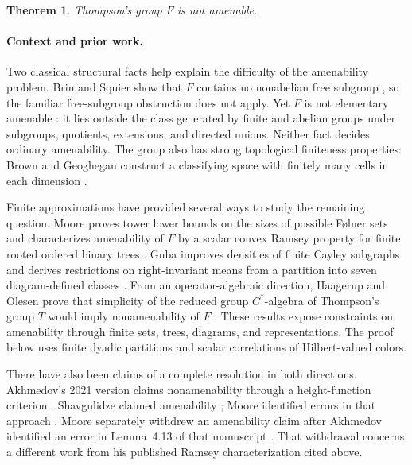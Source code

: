 \documentclass[11pt]{article}
\newtheorem{theorem}{Theorem}[section]
\theoremstyle{definition}
\numberwithin{equation}{section}
\begin{document}
\begin{theorem}\label{thm:main}
Thompson's group \(F\) is not amenable.
\end{theorem}

\paragraph{Context and prior work.}
Two classical structural facts help explain the difficulty of the
amenability problem. Brin and Squier show that \(F\) contains no
nonabelian free subgroup \cite[Theorem~3.1]{BrinSquier1985}, so the familiar
free-subgroup obstruction does not apply. Yet \(F\) is not elementary
amenable \cite[Theorem~4.10]{CannonFloydParry1996}: it lies outside the class
generated by finite and abelian groups under subgroups, quotients,
extensions, and directed unions. Neither fact decides ordinary
amenability. The group also has strong topological finiteness properties:
Brown and Geoghegan construct a classifying space with finitely many
cells in each dimension \cite{BrownGeoghegan1984}.

Finite approximations have provided several ways to study the remaining
question. Moore proves tower lower bounds on the sizes of possible
F\o lner sets \cite[Theorem~1.1]{MooreFolner2013} and characterizes
amenability of \(F\) by a scalar convex Ramsey property for finite rooted
ordered binary trees \cite[Theorem~3.1]{Moore2013}. Guba improves densities
of finite Cayley subgraphs \cite{Guba2025Density} and derives restrictions
on right-invariant means from a partition into seven diagram-defined
classes \cite{Guba2026}. From an operator-algebraic
direction, Haagerup and Olesen prove that simplicity of the reduced group
\(C^*\)-algebra of Thompson's group \(T\) would imply nonamenability of
\(F\) \cite[Theorem~5.5]{HaagerupOlesen2017}. These results expose constraints
on amenability through finite sets, trees, diagrams, and representations.
The proof below uses finite dyadic partitions and scalar correlations of
Hilbert-valued colors.

There have also been claims of a complete resolution in both directions.
Akhmedov's 2021 version claims nonamenability through a height-function
criterion \cite{Akhmedov2021}. Shavgulidze claimed amenability
\cite{Shavgulidze2009}; Moore identified errors in that approach
\cite{Moore2011Critique}. Moore separately withdrew an amenability claim
after Akhmedov identified an error in Lemma~4.13 of that manuscript
\cite{Moore2012Withdrawn}. That withdrawal concerns a different work from
his published Ramsey characterization cited above.
\end{document}
